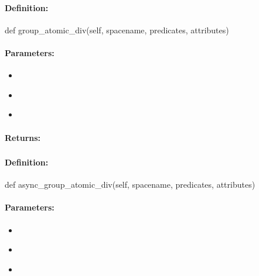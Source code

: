 \paragraph{Definition:}
\begin{pythoncode}
def group_atomic_div(self, spacename, predicates, attributes)
\end{pythoncode}

\paragraph{Parameters:}
\begin{itemize}[noitemsep]
\item {}\\

\item {}\\

\item {}\\

\end{itemize}

\paragraph{Returns:}


\pagebreak
\subsubsection{}
\label{api:python:async_group_atomic_div}


\paragraph{Definition:}
\begin{pythoncode}
def async_group_atomic_div(self, spacename, predicates, attributes)
\end{pythoncode}

\paragraph{Parameters:}
\begin{itemize}[noitemsep]
\item {}\\

\item {}\\

\item {}\\

\end{itemize}

